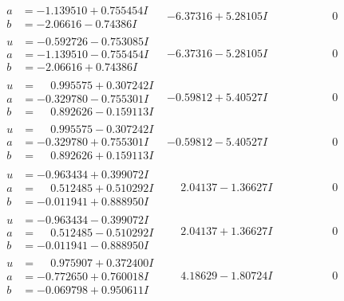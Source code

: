 \documentclass[1p]{elsarticle_modified}
\theoremstyle{definition}
\begin{document}
$$\begin{array}{c|c|c}
\begin{aligned}
a &= -1.139510 + 0.755454 I \\
b &= -2.06616 - 0.74386 I\end{aligned}
 & -6.37316 + 5.28105 I & \phantom{-0.000000 } 0 \\ \hline\begin{aligned}
u &= -0.592726 - 0.753085 I \\
a &= -1.139510 - 0.755454 I \\
b &= -2.06616 + 0.74386 I\end{aligned}
 & -6.37316 - 5.28105 I & \phantom{-0.000000 } 0 \\ \hline\begin{aligned}
u &= \phantom{-}0.995575 + 0.307242 I \\
a &= -0.329780 - 0.755301 I \\
b &= \phantom{-}0.892626 - 0.159113 I\end{aligned}
 & -0.59812 + 5.40527 I & \phantom{-0.000000 } 0 \\ \hline\begin{aligned}
u &= \phantom{-}0.995575 - 0.307242 I \\
a &= -0.329780 + 0.755301 I \\
b &= \phantom{-}0.892626 + 0.159113 I\end{aligned}
 & -0.59812 - 5.40527 I & \phantom{-0.000000 } 0 \\ \hline\begin{aligned}
u &= -0.963434 + 0.399072 I \\
a &= \phantom{-}0.512485 + 0.510292 I \\
b &= -0.011941 + 0.888950 I\end{aligned}
 & \phantom{-}2.04137 - 1.36627 I & \phantom{-0.000000 } 0 \\ \hline\begin{aligned}
u &= -0.963434 - 0.399072 I \\
a &= \phantom{-}0.512485 - 0.510292 I \\
b &= -0.011941 - 0.888950 I\end{aligned}
 & \phantom{-}2.04137 + 1.36627 I & \phantom{-0.000000 } 0 \\ \hline\begin{aligned}
u &= \phantom{-}0.975907 + 0.372400 I \\
a &= -0.772650 + 0.760018 I \\
b &= -0.069798 + 0.950611 I\end{aligned}
 & \phantom{-}4.18629 - 1.80724 I & \phantom{-0.000000 } 0 \\ \hline\begin{aligned}

\end{aligned}
\end{array}$$
\end{document}
